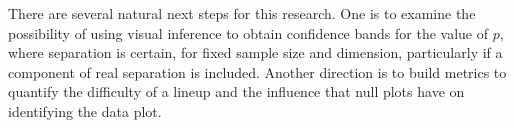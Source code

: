 %

There are several natural next steps for this research. One is to examine the possibility of using visual inference to obtain confidence bands for the value of $p$, where separation is certain, for fixed sample size and dimension, particularly if a component of real separation is included. Another direction is to build metrics to quantify the difficulty of a lineup and the influence that null plots have on identifying the data plot. 


